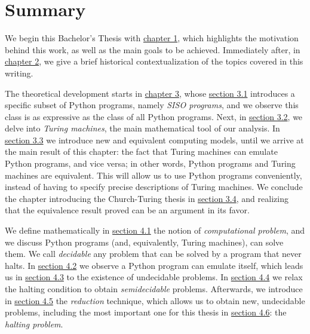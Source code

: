 %

\chapter{Summary}



We begin this Bachelor's Thesis with \hyperref[ch:motivacion]{chapter 1}, which highlights the motivation behind this work, as well as the main goals to be achieved. Immediately after, in \hyperref[ch:historia]{chapter 2}, we give a brief historical contextualization of the topics covered in this writing.

The theoretical development starts in \hyperref[ch:programas-python-maquinas-turing]{chapter 3}, whose \hyperref[sec:programas-python]{section 3.1} introduces a specific subset of Python programs, namely \emph{SISO programs}, and we observe this class is as expressive as the class of all Python programs. Next, in \hyperref[sec:maquinas-turing]{section 3.2}, we delve into \emph{Turing machines}, the main mathematical tool of our analysis. In \hyperref[sec:equivalencia]{section 3.3} we introduce new and equivalent computing models, until we arrive at the main result of this chapter: the fact that Turing machines can emulate Python programs, and vice versa; in other words, Python programs and Turing machines are equivalent. This will allow us to use Python programs conveniently, instead of having to specify precise descriptions of Turing machines. We conclude the chapter introducing the Church-Turing thesis in \hyperref[sec:church-turing]{section 3.4}, and realizing that the equivalence result proved can be an argument in its favor.

We define mathematically in \hyperref[sec:problemas-decidibles]{section 4.1} the notion of \emph{computational problem}, and we discuss Python programs (and, equivalently, Turing machines), can solve them. We call \emph{decidable} any problem that can be solved by a program that never halts. In \hyperref[sec:universalidad]{section 4.2} we observe a Python program can emulate itself, which leads us in \hyperref[sec:problemas-no-decidibles]{section 4.3} to the existence of undecidable problems. In \hyperref[sec:problemas-semidecidibles]{section 4.4} we relax the halting condition to obtain \emph{semidecidable} problems. Afterwards, we introduce in \hyperref[sec:reducciones]{section 4.5} the \emph{reduction} technique, which allows us to obtain new, undecidable problems, including the most important one for this thesis in \hyperref[sec:problema-parada]{section 4.6}: the \emph{halting problem}.

